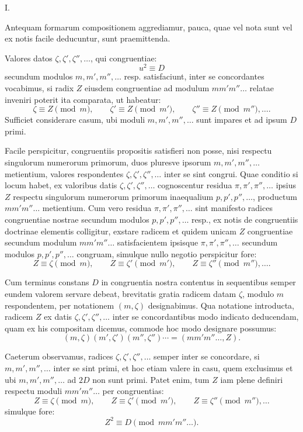 \documentclass[11pt]{article}
\begin{document}
\begin{center}I.\end{center}

Antequam formarum compositionem aggrediamur, pauca, quae vel nota sunt vel ex notis facile deducuntur, sunt praemittenda.

Valores datos $\zeta,\zeta',\zeta'',\ldots$, qui congruentiae:
\[
 u^2\equiv D
\]
secundum modulos $m,m',m'',\ldots$ resp. satisfaciunt, inter se concordantes vocabimus, si radix $Z$ eiusdem congruentiae ad modulum $mm'm''\ldots$ relatae inveniri poterit ita comparata, ut habeatur:
\[
 \zeta\equiv Z\pmod m,\qquad \zeta'\equiv Z\pmod {m'},\qquad \zeta''\equiv Z\pmod {m''},\ldots.
\]
Sufficiet considerare casum, ubi moduli $m,m',m'',\ldots$ sunt impares et ad ipsum $D$ primi.

Facile perspicitur, congruentiis propositis satisfieri non posse, nisi respectu singulorum numerorum primorum, duos pluresve ipsorum $m,m',m'',\ldots$ metientium, valores respondentes $\zeta,\zeta',\zeta'',\ldots$ inter se sint congrui. Quae conditio si locum habet, ex valoribus datis $\zeta,\zeta',\zeta'',\ldots$ cognoscentur residua $\pi,\pi',\pi'',\ldots$ ipsius $Z$ respectu singulorum numerorum primorum inaequalium $p,p',p'',\ldots$, productum $mm'm''\ldots$ metientium. Cum vero residua $\pi,\pi',\pi'',\ldots$ sint manifesto radices congruentiae nostrae secundum modulos $p,p',p'',\ldots$ resp., ex notis de congruentiis doctrinae elementis colligitur, exstare radicem et quidem unicam $Z$ congruentiae secundum modulum $mm'm''\ldots$ satisfacientem ipsisque $\pi,\pi',\pi'',\ldots$ secundum modulos $p,p',p'',\ldots$ congruam, simulque nullo negotio perspicitur fore:
\[
 Z\equiv\zeta\pmod m,\qquad Z\equiv\zeta'\pmod {m'},\qquad Z\equiv\zeta''\pmod {m''},\ldots.
\]

Cum terminus constans $D$ in congruentia nostra contentus in sequentibus semper eundem valorem servare debeat, brevitatis gratia radicem datam $\zeta$, modulo $m$ respondentem, per notationem $(m,\zeta)$ designabimus. Qua notatione introducta, radicem $Z$ ex datis $\zeta,\zeta',\zeta'',\ldots$ inter se concordantibus modo indicato deducendam, quam ex his compositam dicemus, commode hoc modo designare possumus:
\[
 (m,\zeta)(m',\zeta')(m'',\zeta'')\cdots=(mm'm''\ldots,Z).
\]

Caeterum observamus, radices $\zeta,\zeta',\zeta'',\ldots$ semper inter se concordare, si $m,m',m'',\ldots$ inter se sint primi, et hoc etiam valere in casu, quem exclusimus et ubi $m,m',m'',\ldots$ ad $2D$ non sunt primi. Patet enim, tum $Z$ iam plene definiri respectu moduli $mm'm''\ldots$ per congruentias:
\[
 Z\equiv\zeta\pmod m,\qquad Z\equiv\zeta'\pmod {m'},\qquad Z\equiv\zeta''\pmod {m''},\ldots
\]
simulque fore:
\[
 Z^2\equiv D\pmod {mm'm''\ldots}.
\]
\end{document}
